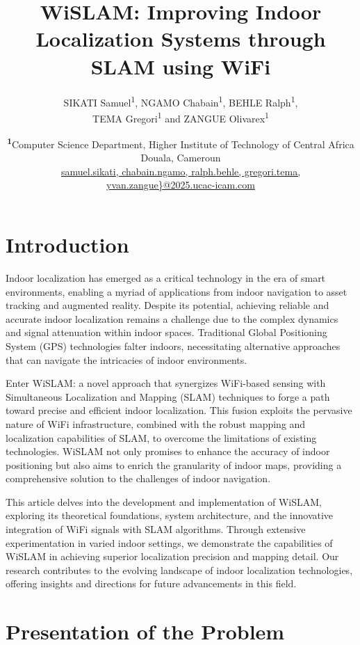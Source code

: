 \documentclass[
	a4paper, %
	11pt, %
	unnumberedsections, %
	twoside, %
]{LTJournalArticle}
\title{WiSLAM: Improving Indoor Localization Systems through SLAM using WiFi\\} %
\author{%
	SIKATI Samuel\textsuperscript{1}, NGAMO Chabain\textsuperscript{1}, BEHLE Ralph\textsuperscript{1}, \\ TEMA Gregori\textsuperscript{1} and ZANGUE Olivarex\textsuperscript{1}
}
\date{\footnotesize\textsuperscript{\textbf{1}}Computer Science Department, Higher Institute of Technology of Central Africa \\ Douala, Cameroun\\
\href{mailto:samuel.sikati@2025.ucac-icam.com,chabain.ngamo@2025.ucac-icam.com,ralph.behle@2025.ucac-icam.com,gregori.tema@2025.ucac-icam.com,yvan.zangue@2025.ucac-icam.com}{{samuel.sikati, chabain.ngamo, ralph.behle, gregori.tema, yvan.zangue\}@2025.ucac-icam.com} }}
\begin{document}
\maketitle %


\section{Introduction}

Indoor localization has emerged as a critical technology in the era of smart environments, enabling a myriad of applications from indoor navigation to asset tracking and augmented reality. Despite its potential, achieving reliable and accurate indoor localization remains a challenge due to the complex dynamics and signal attenuation within indoor spaces. Traditional Global Positioning System (GPS) technologies falter indoors, necessitating alternative approaches that can navigate the intricacies of indoor environments.

Enter WiSLAM: a novel approach that synergizes WiFi-based sensing with Simultaneous Localization and Mapping (SLAM) techniques to forge a path toward precise and efficient indoor localization. This fusion exploits the pervasive nature of WiFi infrastructure, combined with the robust mapping and localization capabilities of SLAM, to overcome the limitations of existing technologies. WiSLAM not only promises to enhance the accuracy of indoor positioning but also aims to enrich the granularity of indoor maps, providing a comprehensive solution to the challenges of indoor navigation.

This article delves into the development and implementation of WiSLAM, exploring its theoretical foundations, system architecture, and the innovative integration of WiFi signals with SLAM algorithms. Through extensive experimentation in varied indoor settings, we demonstrate the capabilities of WiSLAM in achieving superior localization precision and mapping detail. Our research contributes to the evolving landscape of indoor localization technologies, offering insights and directions for future advancements in this field.

\section{Presentation of the Problem}
\end{document}
